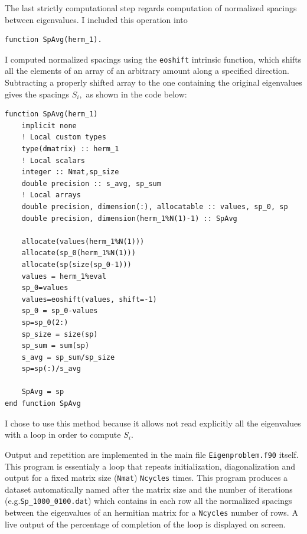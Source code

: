 \documentclass[a4paper]{article}
\begin{document}
The last strictly computational step regards computation of normalized spacings between eigenvalues.
I included this operation into
\begin{lstlisting}
function SpAvg(herm_1).
\end{lstlisting}
I computed normalized spacings using the \lstinline{eoshift} intrinsic function, which shifts all the elements of an array of an arbitrary amount along a specified direction.
Subtracting a properly shifted array to the one containing the original eigenvalues gives the spacings $S_i,$ as shown in the code below:
\begin{lstlisting}
function SpAvg(herm_1)
    implicit none
    ! Local custom types
    type(dmatrix) :: herm_1
    ! Local scalars
    integer :: Nmat,sp_size
    double precision :: s_avg, sp_sum
    ! Local arrays
    double precision, dimension(:), allocatable :: values, sp_0, sp
    double precision, dimension(herm_1%N(1)-1) :: SpAvg

    allocate(values(herm_1%N(1)))
    allocate(sp_0(herm_1%N(1)))
    allocate(sp(size(sp_0-1)))
    values = herm_1%eval
    sp_0=values
    values=eoshift(values, shift=-1)
    sp_0 = sp_0-values
    sp=sp_0(2:)
    sp_size = size(sp)
    sp_sum = sum(sp)
    s_avg = sp_sum/sp_size
    sp=sp(:)/s_avg

    SpAvg = sp
end function SpAvg
\end{lstlisting}
I chose to use this method because it allows not read explicitly all the eigenvalues with a loop in order to compute $S_i$.

Output and repetition are implemented in the main file \lstinline{Eigenproblem.f90} itself.
This program is essentialy a loop that repeats initialization, diagonalization and output for a fixed matrix size (\lstinline{Nmat}) \lstinline{Ncycles} times.
This program produces a dataset automatically named after the matrix size and the number of iterations (e.g.\lstinline{Sp_1000_0100.dat}) which contains in each row all the normalized spacings between the eigenvalues of an hermitian matrix for a \lstinline{Ncycles} number of rows.
A live output of the percentage of completion of the loop is displayed on screen.
\end{document}
